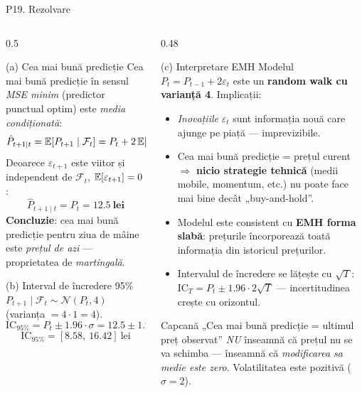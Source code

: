 \documentclass[9pt, aspectratio=169, t]{beamer}
\begin{document}
\begin{frame}[shrink=22]{P19. Rezolvare}
\begin{columns}[T]
\begin{column}{0.5\textwidth}
\begin{block}{(a) Cea mai bună predicție}
Cea mai bună predicție în sensul \emph{MSE minim} (predictor punctual optim) este \emph{media condiționată}:
\[
\hat P_{t+1\mid t} = \mathbb{E}[P_{t+1}\mid \mathcal F_t] = P_t + 2\,\mathbb{E}[\varepsilon_{t+1}\mid \mathcal F_t]
\]
Deoarece $\varepsilon_{t+1}$ este viitor și independent de $\mathcal F_t$, $\mathbb{E}[\varepsilon_{t+1}]=0$:
\[
\boxed{\hat P_{t+1\mid t} = P_t = \mathbf{12.5\ \text{lei}}}
\]
\textbf{Concluzie}: cea mai bună predicție pentru ziua de mâine este \emph{prețul de azi} --- proprietatea de \emph{martingală}.
\end{block}
\begin{block}{(b) Interval de încredere 95\%}
$P_{t+1}\mid\mathcal F_t \sim \mathcal N(P_t, 4)$ (varianța $= 4\cdot 1=4$).
\[
\text{IC}_{95\%} = P_t \pm 1.96\cdot \sigma = 12.5 \pm 1.96\cdot 2
\]
\[
\boxed{\text{IC}_{95\%} = [\mathbf{8.58,\ 16.42}]\ \text{lei}}
\]
\end{block}
\end{column}
\begin{column}{0.48\textwidth}
\begin{block}{(c) Interpretare EMH}
Modelul $P_t = P_{t-1} + 2\varepsilon_t$ este un \textbf{random walk cu varianță 4}. Implicații:
\begin{itemize}\setlength{\itemsep}{0pt}
\item \emph{Inovațiile} $\varepsilon_t$ sunt informația nouă care ajunge pe piață --- imprevizibile.
\item Cea mai bună predicție = prețul curent $\Rightarrow$ \textbf{nicio strategie tehnică} (medii mobile, momentum, etc.) nu poate face mai bine decât „buy-and-hold''.
\item Modelul este consistent cu \textbf{EMH forma slabă}: prețurile încorporează toată informația din istoricul prețurilor.
\item Intervalul de încredere se lățește cu $\sqrt T$: $\text{IC}_{T} = P_t \pm 1.96\cdot 2\sqrt T$ --- incertitudinea crește cu orizontul.
\end{itemize}
\end{block}
\begin{alertblock}{Capcană}
„Cea mai bună predicție = ultimul preț observat'' \emph{NU} înseamnă că prețul nu se va schimba --- înseamnă că \emph{modificarea sa medie este zero}. Volatilitatea este pozitivă ($\sigma=2$).
\end{alertblock}
\end{column}
\end{columns}
\end{frame}
\end{document}
